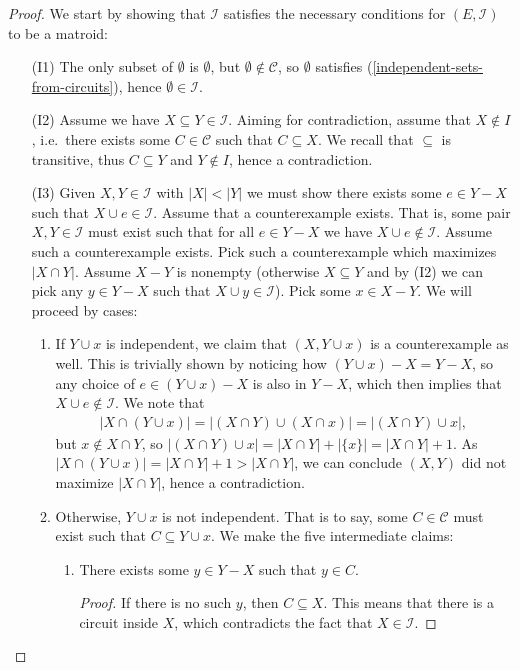 \begin{proof} We start by showing that $\mathcal I $ satisfies the necessary conditions for $(E, \mathcal I )$ to be a matroid:
    \begin{enumerate} 
        \item[(I1)] The only subset of $\emptyset $ is $ \emptyset $, but $ \emptyset \not\in \mathcal C $, so $ \emptyset $ satisfies (\ref{independent-sets-from-circuits}), hence $\emptyset \in \mathcal I$.
        \item[(I2)] Assume we have $X \subseteq Y \in \mathcal I$. Aiming for contradiction, assume that $X \not\in I$, i.e.\ there exists some $C \in \mathcal C $ such that $C \subseteq X$. We recall that $\subseteq $ is transitive, thus $C \subseteq Y$ and $Y \not\in I$, hence a contradiction.
        \item[(I3)] Given $X, Y \in \mathcal I $ with $|X| < |Y|$ we must show there exists some $e \in Y - X$ such that $X \cup e \in \mathcal I$. Assume that a counterexample exists. That is, some pair $X, Y \in \mathcal I$ must exist such that for all $e \in Y - X$ we have $X \cup e \not\in \mathcal I$. Assume such a counterexample exists. Pick such a counterexample which maximizes $|X \cap Y|$. Assume $X - Y$ is nonempty (otherwise $X \subseteq Y$ and by (I2) we can pick any $ y\in Y - X$ such that $X \cup y \in \mathcal I$). Pick some $x \in X - Y$. We will proceed by cases:
          \begin{enumerate}
            \item If $Y \cup x$ is independent, we claim that $(X, Y \cup x)$ is a counterexample as well. This is trivially shown by noticing how $(Y \cup x) - X = Y - X$, so any choice of $e \in (Y \cup x) - X$ is also in $Y-X$, which then implies that $X\cup e\notin \mathcal{I}$.
            We note that 
              \begin{align*}
              |X \cap (Y \cup x)| = |(X \cap Y) \cup (X \cap x)| = |(X \cap Y) \cup x|,
              \end{align*}
              but $x \not\in X \cap Y$, so $|(X \cap Y) \cup x| = |X \cap Y| + |\{x\}| = |X \cap Y| + 1$. As $|X\cap (Y\cup x)| = |X \cap Y| + 1 > |X \cap Y|$, we can conclude $(X, Y)$ did not maximize $|X \cap Y|$, hence a contradiction.
            \item Otherwise, $Y \cup x$ is not independent. That is to say, some $C \in \mathcal C$ must exist such that $C \subseteq Y \cup x$. We make the five intermediate claims:
            \begin{enumerate}
              \item There exists some $y \in Y - X$ such that $y \in C$.
                \begin{proof}
                  If there is no such $y$, then $C \subseteq X$. This means that there is a circuit inside $X$, which contradicts the fact that $X \in \mathcal{I}$.
                \end{proof}


\end{enumerate}
\end{enumerate}
\end{enumerate}
\end{proof}
